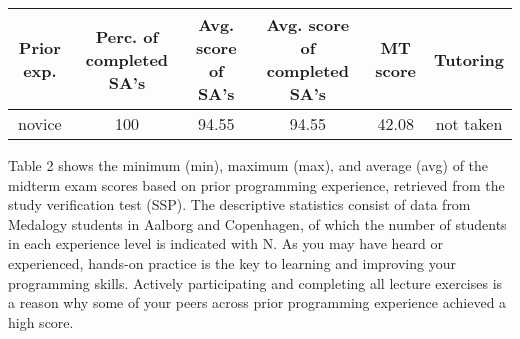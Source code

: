 \documentclass[]{article}
\begin{document}
\begin{longtable}[]{@{}cccccc@{}}
\toprule
\begin{minipage}[b]{0.09\columnwidth}\centering\strut
Prior exp.\strut
\end{minipage} & \begin{minipage}[b]{0.17\columnwidth}\centering\strut
Perc. of completed SA's\strut
\end{minipage} & \begin{minipage}[b]{0.14\columnwidth}\centering\strut
Avg. score of SA's\strut
\end{minipage} & \begin{minipage}[b]{0.20\columnwidth}\centering\strut
Avg. score of completed SA's\strut
\end{minipage} & \begin{minipage}[b]{0.11\columnwidth}\centering\strut
MT score\strut
\end{minipage} & \begin{minipage}[b]{0.11\columnwidth}\centering\strut
Tutoring\strut
\end{minipage}\tabularnewline
\midrule
\endhead
\begin{minipage}[t]{0.09\columnwidth}\centering\strut
novice\strut
\end{minipage} & \begin{minipage}[t]{0.17\columnwidth}\centering\strut
100\strut
\end{minipage} & \begin{minipage}[t]{0.14\columnwidth}\centering\strut
94.55\strut
\end{minipage} & \begin{minipage}[t]{0.20\columnwidth}\centering\strut
94.55\strut
\end{minipage} & \begin{minipage}[t]{0.11\columnwidth}\centering\strut
42.08\strut
\end{minipage} & \begin{minipage}[t]{0.11\columnwidth}\centering\strut
not taken\strut
\end{minipage}\tabularnewline
\bottomrule
\end{longtable}

Table 2 shows the minimum (min), maximum (max), and average (avg) of the
midterm exam scores based on prior programming experience, retrieved
from the study verification test (SSP). The descriptive statistics
consist of data from Medalogy students in Aalborg and Copenhagen, of
which the number of students in each experience level is indicated with
N. As you may have heard or experienced, hands-on practice is the key to
learning and improving your programming skills. Actively participating
and completing all lecture exercises is a reason why some of your peers
across prior programming experience achieved a high score.
\end{document}
